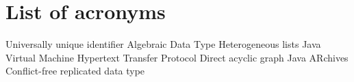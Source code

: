 \chapter{List of acronyms}

{\small
\begin{acronym}[XXXXXXXX]
       {Universally unique identifier}
        {Algebraic Data Type}
      {Heterogeneous lists}
        {Java Virtual Machine}
       {Hypertext Transfer Protocol}
        {Direct acyclic graph}
        {Java ARchives}
       {Conflict-free replicated data type}
\end{acronym}
}

